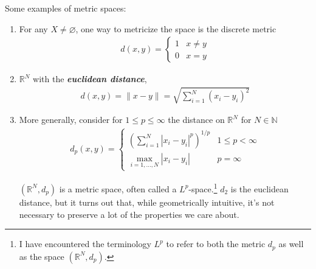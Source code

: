 \documentclass{article}
\newcommand{\norm}[1]{\lVert #1 \rVert}
\newcommand{\keyword}[1]{\textit{\textbf{#1}}\index{#1}}
\theoremstyle{definition}
\begin{document}
Some examples of metric spaces:
\begin{enumerate}
  \item For any $X \ne \varnothing$, one way to metricize the space is the discrete metric
    \begin{align*}
      d(x, y) = \begin{cases}
        1 & x \ne y \\
        0 & x = y
      \end{cases}
    \end{align*}

  \item $\mathbb{R}^N$ with the \keyword{euclidean distance},
    \begin{align*}
      d(x, y)
      = \norm{x - y}
      = \sqrt{\sum^{N}_{i = 1} (x_i - y_i)^2}
    \end{align*}

  \item More generally, consider for $1 \le p \le \infty$ the distance on $\mathbb{R}^N$ for $N \in \mathbb{N}$
    \begin{align*}
      d_p(x, y)
      =
      \begin{cases}
        \left(\displaystyle\sum^{N}_{i = 1} |x_i - y_i|^p\right)^{1 / p}
          & 1 \le p < \infty \\[12pt]
        \displaystyle\max_{i = 1, \ldots, N} |x_i - y_i|
          & p = \infty
      \end{cases}
    \end{align*}

    $(\mathbb{R}^N, d_p)$ is a metric space, often called a $L^p$-space.\footnote{I have encountered the terminology $L^p$ to refer to both the metric $d_p$ as well as the space $(\mathbb{R}^N, d_p)$.} $d_2$ is the euclidean distance, but it turns out that, while geometrically intuitive, it's not necessary to preserve a lot of the properties we care about.
    \begin{figure}[h]
      \centering
      \label{fig:unit_circle_in_r_2_under_different_d_p_metrics}
\end{figure}
\end{enumerate}
\end{document}
